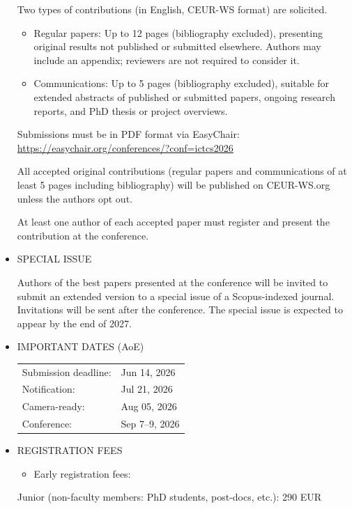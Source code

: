 \documentclass[prodmode,acmtecs]{acmsmall} %
\begin{document}
\begin{itemize}
  Two types of contributions (in English, CEUR-WS format) are solicited. 
 
\begin{itemize}\item  Regular papers: Up to 12 pages (bibliography excluded), presenting original results not published or submitted elsewhere. Authors may include an appendix; reviewers are not required to consider it.
\item  Communications: Up to 5 pages (bibliography excluded), suitable for extended abstracts of published or submitted papers, ongoing research reports, and PhD thesis or project overviews.
\end{itemize} 
  Submissions must be in PDF format via EasyChair: \href{https://easychair.org/conferences/?conf=ictcs2026}{https://easychair.org/conferences/?conf=ictcs2026} 
 
  All accepted original contributions (regular papers and communications of at least 5 pages including bibliography) will be published on CEUR-WS.org unless the authors opt out. 
 
  At least one author of each accepted paper must register and present the contribution at the conference. 
 
\item  SPECIAL ISSUE 
 
  Authors of the best papers presented at the conference will be invited to submit an extended version to a special issue of a Scopus-indexed journal. Invitations will be sent after the conference. The special issue is expected to appear by the end of 2027. 
 
\item  IMPORTANT DATES (AoE) 
 
\begin{tabulary}{\linewidth}{LL}Submission deadline:  & Jun 14, 2026 \\
Notification:  & Jul 21, 2026 \\
Camera-ready:  & Aug 05, 2026 \\
Conference:  & Sep 7–9, 2026 \\
\end{tabulary}
 
\item  REGISTRATION FEES 
 
\begin{itemize}\item  Early registration fees:
\end{itemize} 
  Junior (non-faculty members: PhD students, post-docs, etc.): 290 EUR 
 

\end{itemize}
\end{document}
